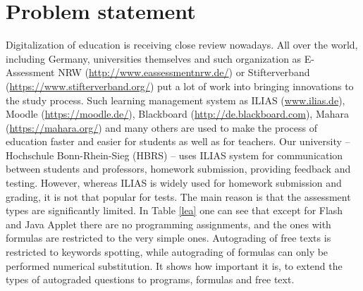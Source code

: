 \chapter{Problem statement}

Digitalization of education is receiving close review nowadays. All over the world, including Germany, universities themselves and such organization as E-Assessment NRW (\url{http://www.eassessmentnrw.de/}) or Stifterverband (\url{https://www.stifterverband.org/}) put a lot of work into bringing innovations to the study process. Such learning management system as ILIAS (\url{www.ilias.de}), Moodle (\url{https://moodle.de/}), Blackboard (\url{http://de.blackboard.com}), Mahara (\url{https://mahara.org/}) and many others are used to make the process of education faster and easier for students as well as for teachers. Our university -- Hochschule Bonn-Rhein-Sieg (HBRS) -- uses ILIAS system for communication between students and professors, homework submission, providing feedback and testing. However, whereas ILIAS is widely used for homework submission and grading, it is not that popular for tests. The main reason is that the assessment types are significantly limited. In Table \ref{lea} one can see that except for Flash and Java Applet there are no programming assignments, and the ones with formulas are restricted to the very simple ones. Autograding of free texts is restricted to keywords spotting, while autograding of formulas can only be performed numerical substitution. It shows how important it is, to extend the types of autograded questions to programs, formulas and free text.\\

